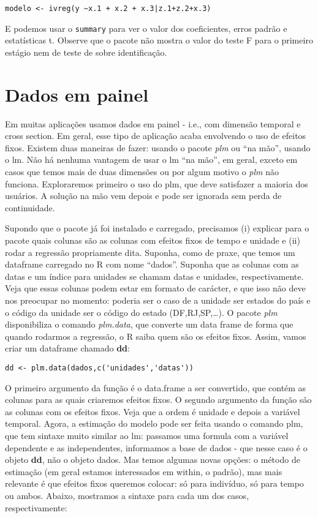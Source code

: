 \documentclass[
]{book}
\begin{document}
\begin{verbatim}
modelo <- ivreg(y ~x.1 + x.2 + x.3|z.1+z.2+x.3)
\end{verbatim}

E podemos usar o \texttt{summary} para ver o valor dos coeficientes, erros padrão e estatísticas t. Observe que o pacote não mostra o valor do teste F para o primeiro estágio nem de teste de sobre identificação.

\hypertarget{dados-em-painel}{%
\section{Dados em painel}\label{dados-em-painel}}

Em muitas aplicações usamos dados em painel - i.e., com dimensão temporal e cross section. Em geral, esse tipo de aplicação acaba envolvendo o uso de efeitos fixos. Existem duas maneiras de fazer: usando o pacote \emph{plm} ou ``na mão'', usando o lm. Não há nenhuma vantagem de usar o lm ``na mão'', em geral, exceto em casos que temos mais de duas dimensões ou por algum motivo o \emph{plm} não funciona. Exploraremos primeiro o uso do plm, que deve satisfazer a maioria dos usuários. A solução na mão vem depois e pode ser ignorada sem perda de continuidade.

Supondo que o pacote já foi instalado e carregado, precisamos (i) explicar para o pacote quais colunas são as colunas com efeitos fixos de tempo e unidade e (ii) rodar a regressão propriamente dita. Suponha, como de praxe, que temos um dataframe carregado no R com nome ``dados''. Suponha que as colunas com as datas e um índice para unidades se chamam datas e unidades, respectivamente. Veja que essas colunas podem estar em formato de carácter, e que isso não deve nos preocupar no momento: poderia ser o caso de a unidade ser estados do país e o código da unidade ser o código do estado (DF,RJ,SP,\ldots). O pacote \emph{plm} disponibiliza o comando \emph{plm.data}, que converte um data frame de forma que quando rodarmos a regressão, o R saiba quem são os efeitos fixos. Assim, vamos criar um dataframe chamado \textbf{dd}:

\begin{verbatim}
dd <- plm.data(dados,c('unidades','datas'))
\end{verbatim}

O primeiro argumento da função é o data.frame a ser convertido, que contém as colunas para as quais criaremos efeitos fixos. O segundo argumento da função são as colunas com os efeitos fixos. Veja que a ordem é unidade e depois a variável temporal. Agora, a estimação do modelo pode ser feita usando o comando plm, que tem sintaxe muito similar ao lm: passamos uma formula com a variável dependente e as independentes, informamos a base de dados - que nesse caso é o objeto \textbf{dd}, não o objeto dados. Mas temos algumas novas opções: o método de estimação (em geral estamos interessados em within, o padrão), mas mais relevante é que efeitos fixos queremos colocar: só para indivíduo, só para tempo ou ambos. Abaixo, mostramos a sintaxe para cada um dos casos, respectivamente:
\end{document}
